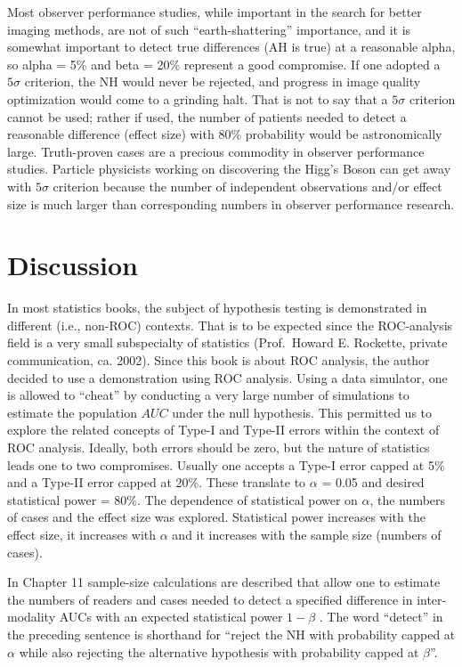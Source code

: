 \documentclass[
]{book}
\begin{document}
Most observer performance studies, while important in the search for better imaging methods, are not of such ``earth-shattering'' importance, and it is somewhat important to detect true differences (AH is true) at a reasonable alpha, so alpha = 5\% and beta = 20\% represent a good compromise. If one adopted a \(5\sigma\) criterion, the NH would never be rejected, and progress in image quality optimization would come to a grinding halt. That is not to say that a \(5\sigma\) criterion cannot be used; rather if used, the number of patients needed to detect a reasonable difference (effect size) with 80\% probability would be astronomically large. Truth-proven cases are a precious commodity in observer performance studies. Particle physicists working on discovering the Higg's Boson can get away with \(5\sigma\) criterion because the number of independent observations and/or effect size is much larger than corresponding numbers in observer performance research.

\hypertarget{discussion}{%
\section{Discussion}\label{discussion}}

In most statistics books, the subject of hypothesis testing is demonstrated in different (i.e., non-ROC) contexts. That is to be expected since the ROC-analysis field is a very small subspecialty of statistics (Prof.~Howard E. Rockette, private communication, ca. 2002). Since this book is about ROC analysis, the author decided to use a demonstration using ROC analysis. Using a data simulator, one is allowed to ``cheat'' by conducting a very large number of simulations to estimate the population \(AUC\) under the null hypothesis. This permitted us to explore the related concepts of Type-I and Type-II errors within the context of ROC analysis. Ideally, both errors should be zero, but the nature of statistics leads one to two compromises. Usually one accepts a Type-I error capped at 5\% and a Type-II error capped at 20\%. These translate to \(\alpha\) = 0.05 and desired statistical power = 80\%. The dependence of statistical power on \(\alpha\), the numbers of cases and the effect size was explored. Statistical power increases with the effect size, it increases with \(\alpha\) and it increases with the sample size (numbers of cases).

In Chapter 11 sample-size calculations are described that allow one to estimate the numbers of readers and cases needed to detect a specified difference in inter-modality AUCs with an expected statistical power \(1-\beta\) . The word ``detect'' in the preceding sentence is shorthand for ``reject the NH with probability capped at \(\alpha\) while also rejecting the alternative hypothesis with probability capped at \(\beta\)''.
\end{document}
